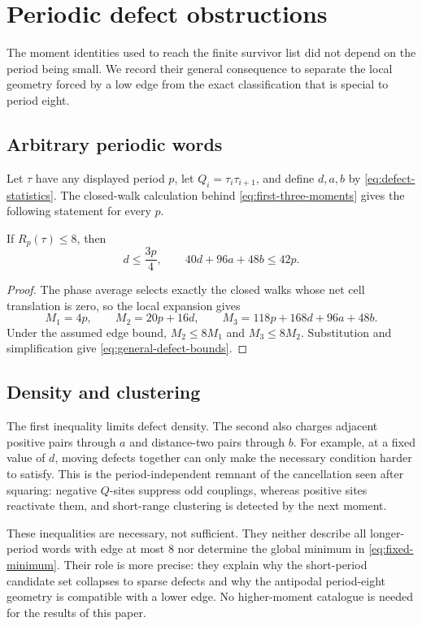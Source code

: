 \section{Periodic defect obstructions}
\label{sec:defect-obstruction}

The moment identities used to reach the finite survivor list did not depend
on the period being small.  We record their general consequence to separate
the local geometry forced by a low edge from the exact classification that is
special to period eight.

\subsection{Arbitrary periodic words}

Let $\tau$ have any displayed period $p$, let $Q_i=\tau_i\tau_{i+1}$, and
define $d,a,b$ by \eqref{eq:defect-statistics}.  The closed-walk calculation
behind \eqref{eq:first-three-moments} gives the following statement for every
$p$.

\begin{theorem}
\label{thm:moment-obstruction}
If $R_p(\tau)\leq8$, then
\begin{equation}
 d\leq\frac{3p}{4},\qquad
 40d+96a+48b\leq42p.
 \label{eq:general-defect-bounds}
\end{equation}
\end{theorem}

\begin{proof}
The phase average selects exactly the closed walks whose net cell translation
is zero, so the local expansion gives
\[
 M_1=4p,\qquad M_2=20p+16d,\qquad
 M_3=118p+168d+96a+48b.
\]
Under the assumed edge bound, $M_2\leq8M_1$ and $M_3\leq8M_2$.
Substitution and simplification give \eqref{eq:general-defect-bounds}.
\end{proof}

\subsection{Density and clustering}

The first inequality limits defect density.  The second also charges adjacent
positive pairs through $a$ and distance-two pairs through $b$.  For example,
at a fixed value of $d$, moving defects together can only make the necessary
condition harder to satisfy.  This is the period-independent remnant of the
cancellation seen after squaring: negative $Q$-sites suppress odd couplings,
whereas positive sites reactivate them, and short-range clustering is detected
by the next moment.

These inequalities are necessary, not sufficient.  They neither describe all
longer-period words with edge at most $8$ nor determine the global minimum in
\eqref{eq:fixed-minimum}.  Their role is more precise: they explain why the
short-period candidate set collapses to sparse defects and why the antipodal
period-eight geometry is compatible with a lower edge.  No higher-moment
catalogue is needed for the results of this paper.
